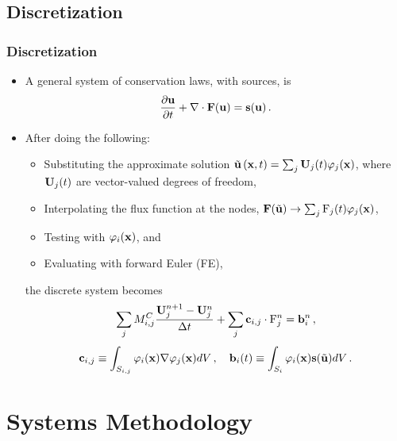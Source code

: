 \documentclass{beamer} \useoutertheme{infolines}
\begin{document}
\subsection{Discretization}
\begin{frame}
\frametitle{Discretization}

\begin{itemize}
  \item A general system of conservation laws, with sources, is
    \begin{equation}
      \pd{\vectorsolution}{t} + \divergence\consfluxvector(\vectorsolution)
        = \conssource(\vectorsolution) \eqp
    \end{equation}
  \item After doing the following:
    \begin{itemize}
      \item Substituting the approximate solution
        $\tilde{\mathbf{u}}\left(\mathbf{x},t\right) =
          \sum_j \mathbf{U}_j(t) \varphi_j(\mathbf{x})$,
          where $\mathbf{U}_j(t)$ are vector-valued degrees of freedom,
      \item Interpolating the flux function at the nodes,
        $\consfluxvector(\approximatevectorsolution)\rightarrow
          \sum_j\consfluxinterpolant_j(t)\testfunction_j(\x)$,
      \item Testing with $\varphi_i(\mathbf{x})$, and
      \item Evaluating with forward Euler (FE),
    \end{itemize}
    the discrete system becomes
    \begin{equation}
      \sum_j\consistentmassentry
        \frac{\solutionvector_j^{n+1}-\solutionvector_j^n}{\dt}
        + \sum_j\gradiententry\cdot\consfluxinterpolant_j^n
        = \ssrhs_i^n \eqc
    \end{equation}
    \begin{equation}
      \gradiententry \equiv \int_{\support\ij}
        \testfunction_i(\x)\nabla\testfunction_j(\x) d\volume \eqc
      \quad
      \ssrhs_i(t) \equiv \int_{\support_i}
        \testfunction_i(\x)\conssource(\approximatevectorsolution)d\volume \eqp
    \end{equation}
\end{itemize}

\end{frame}
\section{Systems Methodology}
\end{document}
